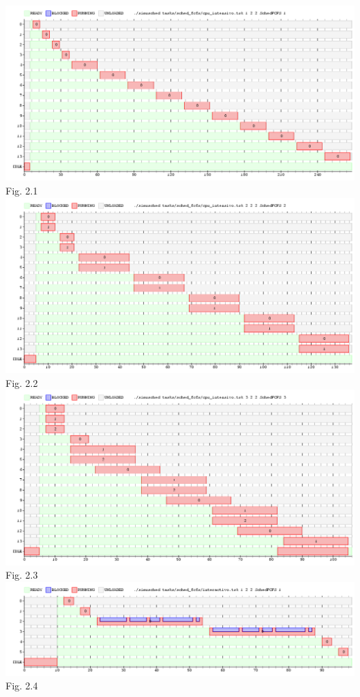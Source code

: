 \documentclass[a4paper]{article}
\begin{document}
\includegraphics [width=17cm]{../graficos/sched_fcfs/cpu_intensivo.png} {Fig. 2.1}
\includegraphics [width=17cm]{../graficos/sched_fcfs/cpu_intensivo2.png} {Fig. 2.2}
\includegraphics [width=17cm]{../graficos/sched_fcfs/cpu_intensivo3.png} {Fig. 2.3}
\includegraphics [width=17cm]{../graficos/sched_fcfs/interactivo.png} {Fig. 2.4}
\end{document}
